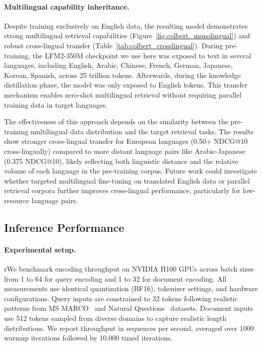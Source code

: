 \documentclass{article}
\begin{document}
\paragraph{Multilingual capability inheritance.}
Despite training exclusively on English data, the resulting model demonstrates strong multilingual retrieval capabilities (Figure~\ref{fig:colbert_monolingual}) and robust cross-lingual transfer (Table~\ref{tab:colbert_crosslingual}). During pre-training, the LFM2-350M checkpoint we use here was exposed to text in several languages, including English, Arabic, Chinese, French, German, Japanese, Korean, Spanish, across 25 trillion tokens. Afterwards, during the knowledge distillation phase, the model was only exposed to English tokens. This transfer mechanism enables zero-shot multilingual retrieval without requiring parallel training data in target languages.

The effectiveness of this approach depends on the similarity between the pre-training multilingual data distribution and the target retrieval tasks. The results show stronger cross-lingual transfer for European languages (0.50+ NDCG@10 cross-lingually) compared to more distant language pairs like Arabic-Japanese (0.375 NDCG@10), likely reflecting both linguistic distance and the relative volume of each language in the pre-training corpus. Future work could investigate whether targeted multilingual fine-tuning on translated English data or parallel retrieval corpora further improves cross-lingual performance, particularly for low-resource language pairs.

\subsection{Inference Performance}

\paragraph{Experimental setup.}
rWe benchmark encoding throughput on NVIDIA H100 GPUs across batch sizes from 1 to 64 for query encoding and 1 to 32 for document encoding. All measurements use identical quantization (BF16), tokenizer settings, and hardware configurations. Query inputs are constrained to 32 tokens following realistic patterns from MS MARCO~\citep{msmarco} and Natural Questions~\citep{kwiatkowski-etal-2019-natural} datasets. Document inputs use 512 tokens sampled from diverse domains to capture realistic length distributions. We report throughput in sequences per second, averaged over 1000 warmup iterations followed by 10,000 timed iterations.
\end{document}
